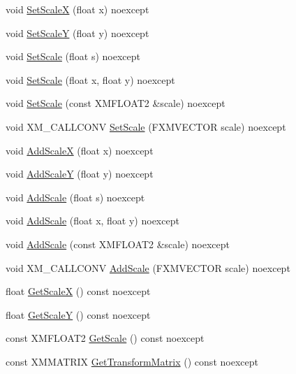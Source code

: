\begin{DoxyCompactItemize}
\item 
void \hyperlink{structmage_1_1_texture_transform_acf3079f1edcdf17d087b751286953f06}{Set\+ScaleX} (float x) noexcept
\item 
void \hyperlink{structmage_1_1_texture_transform_adab76da125263a34b406f0fd1eaa298a}{Set\+ScaleY} (float y) noexcept
\item 
void \hyperlink{structmage_1_1_texture_transform_a836feabb051b7879b7d07b7d96ae840b}{Set\+Scale} (float s) noexcept
\item 
void \hyperlink{structmage_1_1_texture_transform_adeffc787b758ab0f5886fcad1a7b6072}{Set\+Scale} (float x, float y) noexcept
\item 
void \hyperlink{structmage_1_1_texture_transform_af9212429ef4851a8dfc028427c31bda1}{Set\+Scale} (const X\+M\+F\+L\+O\+A\+T2 \&scale) noexcept
\item 
void X\+M\+\_\+\+C\+A\+L\+L\+C\+O\+NV \hyperlink{structmage_1_1_texture_transform_a22ba108c7623abc2abdd8f9fde4d53bd}{Set\+Scale} (F\+X\+M\+V\+E\+C\+T\+OR scale) noexcept
\item 
void \hyperlink{structmage_1_1_texture_transform_a452c32d1bf3dbcd40bf86f7c4c53185f}{Add\+ScaleX} (float x) noexcept
\item 
void \hyperlink{structmage_1_1_texture_transform_ac90e21cc9194e52008918a6579bc4021}{Add\+ScaleY} (float y) noexcept
\item 
void \hyperlink{structmage_1_1_texture_transform_aabe287a058a3b595c6f90fa2e1078adb}{Add\+Scale} (float s) noexcept
\item 
void \hyperlink{structmage_1_1_texture_transform_a144268e37236125cedca4526ce4baff9}{Add\+Scale} (float x, float y) noexcept
\item 
void \hyperlink{structmage_1_1_texture_transform_a80b32b0570b7d37c702cab606cdbb77a}{Add\+Scale} (const X\+M\+F\+L\+O\+A\+T2 \&scale) noexcept
\item 
void X\+M\+\_\+\+C\+A\+L\+L\+C\+O\+NV \hyperlink{structmage_1_1_texture_transform_a6fa7617e33c123fd09b9f1c7e06afaa1}{Add\+Scale} (F\+X\+M\+V\+E\+C\+T\+OR scale) noexcept
\item 
float \hyperlink{structmage_1_1_texture_transform_a93c8747e04566b2273f23a4ae99efd21}{Get\+ScaleX} () const noexcept
\item 
float \hyperlink{structmage_1_1_texture_transform_a414577d7c8bea3c655fe20cb24c5f91b}{Get\+ScaleY} () const noexcept
\item 
const X\+M\+F\+L\+O\+A\+T2 \hyperlink{structmage_1_1_texture_transform_a4d6465ef615e8f1fd3b85541892313c8}{Get\+Scale} () const noexcept
\item 
const X\+M\+M\+A\+T\+R\+IX \hyperlink{structmage_1_1_texture_transform_adac9b7f5138ba53538b860cc83ad7e98}{Get\+Transform\+Matrix} () const noexcept
\end{DoxyCompactItemize}
